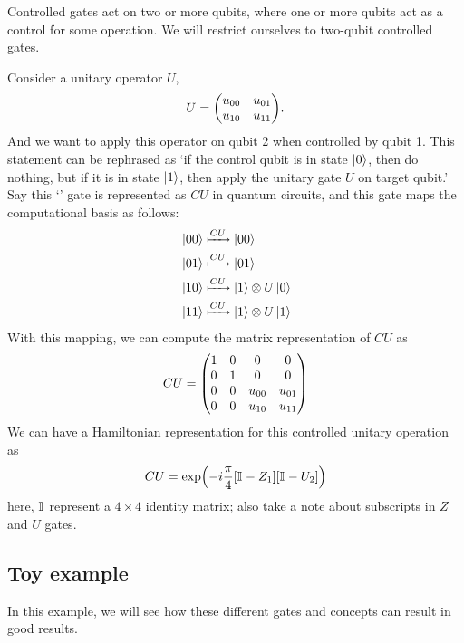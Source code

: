 \documentclass[11pt, oneside, listof=totoc]{scrbook}
\renewcommand{\u}{0}
\renewcommand{\d}{1}
\newcommand{\ku}{\ket{0}}
\newcommand{\kd}{\ket{1}}
\begin{document}
 Controlled gates act on two or more qubits, where one or more qubits act as a control for some operation. We will restrict ourselves to two-qubit controlled gates.

\noindent Consider a unitary operator \(U\),
\[
    U = \mqty(u_{00} & u_{01} \\ u_{10} & u_{11}).
\]
And we want to apply this operator on qubit 2 when controlled by qubit 1. This statement can be rephrased as `if the control qubit is in state \(\ku\), then do nothing, but if it is in state \(\kd\), then apply the unitary gate \(U\) on target qubit.' Say this `' gate is represented as \(CU\) in quantum circuits, and this gate maps the computational basis as follows:
\begin{align*}
     & \ket{\u \u} \xmapsto{CU} \ket{\u \u}      \\
     & \ket{\u \d} \xmapsto{CU} \ket{\u \d}      \\
     & \ket{\d \u} \xmapsto{CU} \kd \otimes U\ku \\
     & \ket{\d \d} \xmapsto{CU} \kd \otimes U\kd \\
\end{align*}
With this mapping, we can compute the matrix representation of \(CU\) as
\begin{equation}
    CU = \mqty(
    1 & 0 & 0 & 0 \\
    0 & 1 & 0 & 0 \\
    0 & 0 & u_{00} & u_{01} \\
    0 & 0 & u_{10} & u_{11}
    )
\end{equation}
We can have a Hamiltonian representation for this controlled unitary operation as
\begin{equation}\label{eq:CU-exp}
    CU = \exp(- i \frac{\pi}{4} [\mathbb{I}_{} - Z_1][\mathbb{I}_{} - U_2])
\end{equation}
here, \(\mathbb{I}_{}\) represent a \(4 \times 4\) identity matrix; also take a note about subscripts in \(Z\) and \(U\) gates.

\subsection{Toy example}

In this example, we will see how these different gates and concepts can result in good results.\hfill \\
\end{document}
